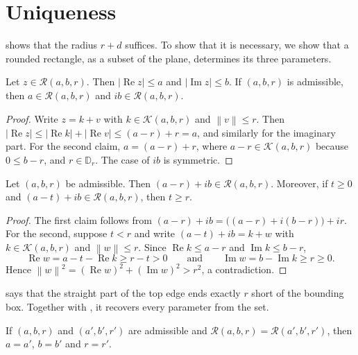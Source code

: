 \documentclass[a4paper,UKenglish,cleveref,autoref,thm-restate]{lipics-v2021}
\newcommand{\Disc}{\mathbb{D}}
\newcommand{\RR}{\mathcal{R}}
\newcommand{\Core}{\mathcal{K}}
\newcommand{\abs}[1]{\left\lvert #1 \right\rvert}
\newcommand{\norm}[1]{\left\lVert #1 \right\rVert}
\DeclareMathOperator{\ReOp}{Re}
\DeclareMathOperator{\ImOp}{Im}
\begin{document}
\section{Uniqueness}\label{sec:uniqueness}

 shows that the radius $r + d$ suffices. To show that it is necessary, we show
that a rounded rectangle, as a subset of the plane, determines its three parameters.

\begin{lemma}\label{lem:bounds}
Let $z \in \RR(a, b, r)$. Then $\abs{\ReOp z} \le a$ and $\abs{\ImOp z} \le b$. If $(a, b, r)$ is
admissible, then $a \in \RR(a, b, r)$ and $ib \in \RR(a, b, r)$.
\end{lemma}

\begin{proof}
Write $z = k + v$ with $k \in \Core(a, b, r)$ and $\norm{v} \le r$. Then
$\abs{\ReOp z} \le \abs{\ReOp k} + \abs{\ReOp v} \le (a - r) + r = a$, and similarly for the
imaginary part. For the second claim, $a = (a - r) + r$, where $a - r \in \Core(a, b, r)$ because
$0 \le b - r$, and $r \in \Disc_r$. The case of $ib$ is symmetric.
\end{proof}

\begin{lemma}\label{lem:top}
Let $(a, b, r)$ be admissible. Then $(a - r) + ib \in \RR(a, b, r)$. Moreover, if $t \ge 0$ and
$(a - t) + ib \in \RR(a, b, r)$, then $t \ge r$.
\end{lemma}

\begin{proof}
The first claim follows from $(a - r) + ib = \bigl((a - r) + i(b - r)\bigr) + ir$. For the second,
suppose $t < r$ and write $(a - t) + ib = k + w$ with $k \in \Core(a, b, r)$ and $\norm{w} \le r$.
Since $\ReOp k \le a - r$ and $\ImOp k \le b - r$,
\[
  \ReOp w = a - t - \ReOp k \ge r - t > 0
  \qquad\text{and}\qquad
  \ImOp w = b - \ImOp k \ge r \ge 0 .
\]
Hence $\norm{w}^2 = (\ReOp w)^2 + (\ImOp w)^2 > r^2$, a contradiction.
\end{proof}

 says that the straight part of the top edge ends exactly $r$ short of the bounding
box. Together with , it recovers every parameter from the set.

\begin{theorem}\label{thm:inj}
If $(a, b, r)$ and $(a', b', r')$ are admissible and $\RR(a, b, r) = \RR(a', b', r')$, then
$a = a'$, $b = b'$ and $r = r'$.
\end{theorem}
\end{document}
